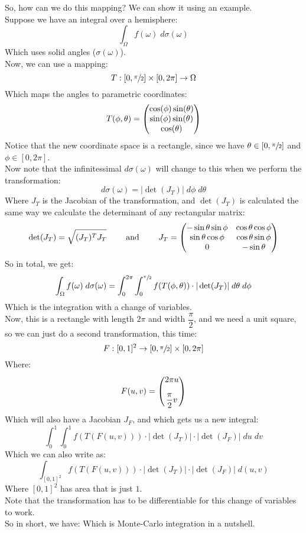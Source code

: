 \documentclass[12pt]{article}
\begin{document}
So, how can we do this mapping?
We can show it using an example. \\
Suppose we have an integral over a hemisphere:
\[ \int_\Omega f(\omega) \; d\sigma(\omega) \]
Which uses solid angles ($\sigma(\omega)$). \\
Now, we can use a mapping:
\[ T: [0, \sfrac{\pi}{2}] \times [0, 2\pi] \to \Omega \]
Which maps the angles to parametric coordinates:
\[ T(\phi, \theta) = \begin{pmatrix} 
    \cos(\phi)\sin(\theta) \\
    \sin(\phi)\sin(\theta) \\
    \cos(\theta)
 \end{pmatrix} \]
Notice that the new coordinate space is a rectangle,
since we have $\theta \in [0, \sfrac{\pi}{2}]$
and $\phi \in [0, 2\pi]$. \\
Now note that the infinitessimal $d\sigma(\omega)$
will change to this when we perform the transformation:
\[ d\sigma(\omega) = |\det(J_T)| \; d\phi \; d\theta \]
Where $J_T$ is the Jacobian of the transformation,
and $\det(J_T)$ is calculated the same way
we calculate the determinant of any rectangular
matrix:
\[ \det(J_T) = \sqrt{(J_T)^TJ_T}
\qquad \text{ and } \qquad J_T = \begin{pmatrix} 
-\sin\theta \sin\phi & \cos\theta \cos\phi  \\
\sin\theta \cos\phi  & \cos\theta \sin\phi\\
0 & -\sin\theta  \end{pmatrix} \]
So in total, we get:
\[ \int_\Omega f(\omega) \; d\sigma(\omega)
= \int_0^{2\pi} \int_0^{\sfrac{\pi}{2}} 
f(T(\phi, \theta)) \cdot |\det(J_T)| 
\; d\theta \; d\phi\]
Which is the integration with a change
of variables. \\

Now, this is a rectangle with length $2\pi$
and width $\dfrac{\pi}{2}$,
and we need a unit square,
so we can just do a second transformation,
this time:
\[ F: [0, 1]^2 \to [0, \sfrac{\pi}{2}] \times [0, 2\pi] \]
Where:
\[ F(u, v) = \pmat{2\pi u \vs{10} \\ \dfrac{\pi}{2}v} \]
Which will also have a Jacobian $J_F$,
and which gets us a new integral:
\[ \int_0^{1} \int_0^{1} 
f(T(F(u, v))) \cdot
|\det(J_T)| \cdot
|\det(J_F)| \; du \; dv \]
Which we can also write as:
\[ \int_{[0, 1]^2}
f(T(F(u, v))) \cdot
|\det(J_T)| \cdot
|\det(J_F)| \; d(u, v) \]
Where $[0, 1]^2$
has area that is just $1$. \\

Note that the transformation has to be 
differentiable for this change of variables
to work. \\

So in short, we have:
Which is Monte-Carlo integration in a nutshell. \\
\end{document}
